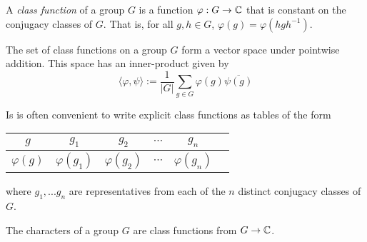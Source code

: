 



\begin{definition}
    A \emph{class function} of a group $G$ is a function $\varphi : G \rightarrow \mathbb{C}$ that is constant on the 
    conjugacy classes of $G$. That is, for all $g,h \in G$, $\varphi(g) = \varphi(hgh^{-1})$.
    
    The set of class functions on a group $G$ form a vector space under pointwise addition. This space has an 
    inner-product given by
    \[
        \langle \varphi, \psi \rangle := \frac{1}{|G|} \sum_{g \in G} \varphi(g)\overline{\psi(g)}
    \]
\end{definition}


Is is often convenient to write explicit class functions as tables of the form 

\begin{center}
\begin{tabular}{c|ccccc}
    $g$ & $g_1$ & $g_2$ & $\cdots$ & $g_n$  \\ \hline
    $\varphi(g)$ & $\varphi(g_1)$ & $\varphi(g_2)$ & $\cdots$ & $\varphi(g_n)$
\end{tabular}
\end{center}
where $g_1, ... g_n$ are representatives from each of the $n$ distinct conjugacy classes of $G$.




\begin{theorem}
    The characters of a group $G$ are class functions from $G \rightarrow \mathbb{C}$.
\end{theorem}


